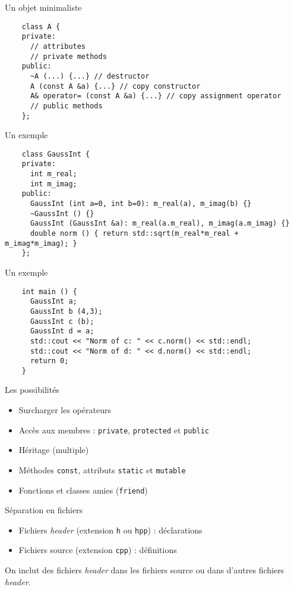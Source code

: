 \begin{frame}[fragile]{Un objet minimaliste}
  \begin{lstlisting}
    class A {
    private:
      // attributes
      // private methods
    public:
      ~A (...) {...} // destructor
      A (const A &a) {...} // copy constructor
      A& operator= (const A &a) {...} // copy assignment operator
      // public methods
    };
  \end{lstlisting}
\end{frame}

\begin{frame}[fragile]{Un exemple}
  \begin{lstlisting}
    class GaussInt {
    private:
      int m_real;
      int m_imag;
    public:
      GaussInt (int a=0, int b=0): m_real(a), m_imag(b) {}
      ~GaussInt () {}
      GaussInt (GaussInt &a): m_real(a.m_real), m_imag(a.m_imag) {}
      double norm () { return std::sqrt(m_real*m_real + m_imag*m_imag); }
    };
  \end{lstlisting}
\end{frame}

\begin{frame}[fragile]{Un exemple}
  \begin{lstlisting}
    int main () {
      GaussInt a;
      GaussInt b (4,3);
      GaussInt c (b);
      GaussInt d = a;
      std::cout << "Norm of c: " << c.norm() << std::endl;
      std::cout << "Norm of d: " << d.norm() << std::endl;
      return 0;
    }
  \end{lstlisting}
\end{frame}

\begin{frame}{Les possibilités}
  \begin{itemize}
  \item Surcharger les opérateurs
  \item Accès aux membres : \texttt{private}, \texttt{protected} et \texttt{public}
  \item Héritage (multiple)
  \item Méthodes \texttt{const}, attributs \texttt{static} et \texttt{mutable}
  \item Fonctions et classes amies (\texttt{friend})
  \end{itemize}
\end{frame}

\begin{frame}{Séparation en fichiers}
  \begin{itemize}
  \item Fichiers \textit{header} (extension \texttt{h} ou \texttt{hpp}) : déclarations
  \item Fichiers source (extension \texttt{cpp}) : définitions
  \end{itemize}

  On inclut des fichiers \textit{header} dans les fichiers source ou dans d'autres fichiers \textit{header}.
\end{frame}


